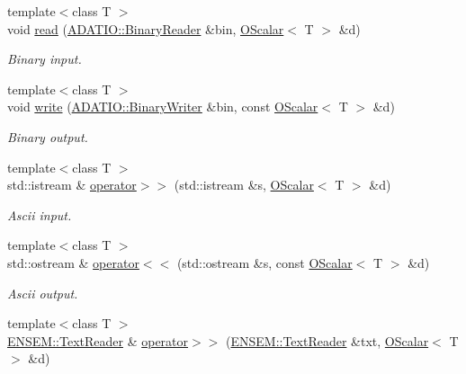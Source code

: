 \begin{DoxyCompactItemize}
\item 
{\footnotesize template$<$class T $>$ }\\void \mbox{\hyperlink{group__obsscalar_ga5b22786975bbf72d834fd044913a417b}{read}} (\mbox{\hyperlink{classADATIO_1_1BinaryReader}{A\+D\+A\+T\+I\+O\+::\+Binary\+Reader}} \&bin, \mbox{\hyperlink{classENSEM_1_1OScalar}{O\+Scalar}}$<$ T $>$ \&d)
\begin{DoxyCompactList}\small\item\em Binary input. \end{DoxyCompactList}\item 
{\footnotesize template$<$class T $>$ }\\void \mbox{\hyperlink{group__obsscalar_ga921d40c8afba8e09044b5c679c71b495}{write}} (\mbox{\hyperlink{classADATIO_1_1BinaryWriter}{A\+D\+A\+T\+I\+O\+::\+Binary\+Writer}} \&bin, const \mbox{\hyperlink{classENSEM_1_1OScalar}{O\+Scalar}}$<$ T $>$ \&d)
\begin{DoxyCompactList}\small\item\em Binary output. \end{DoxyCompactList}\item 
{\footnotesize template$<$class T $>$ }\\std\+::istream \& \mbox{\hyperlink{group__obsscalar_ga8ceaf63a1afb58830666610d78d86809}{operator$>$$>$}} (std\+::istream \&s, \mbox{\hyperlink{classENSEM_1_1OScalar}{O\+Scalar}}$<$ T $>$ \&d)
\begin{DoxyCompactList}\small\item\em Ascii input. \end{DoxyCompactList}\item 
{\footnotesize template$<$class T $>$ }\\std\+::ostream \& \mbox{\hyperlink{group__obsscalar_ga7ac0c3b6cd38466c57c199a30f7795cd}{operator$<$$<$}} (std\+::ostream \&s, const \mbox{\hyperlink{classENSEM_1_1OScalar}{O\+Scalar}}$<$ T $>$ \&d)
\begin{DoxyCompactList}\small\item\em Ascii output. \end{DoxyCompactList}\item 
{\footnotesize template$<$class T $>$ }\\\mbox{\hyperlink{classENSEM_1_1TextReader}{E\+N\+S\+E\+M\+::\+Text\+Reader}} \& \mbox{\hyperlink{group__obsscalar_ga0ec7538d973fc2e40220fd1ef622f982}{operator$>$$>$}} (\mbox{\hyperlink{classENSEM_1_1TextReader}{E\+N\+S\+E\+M\+::\+Text\+Reader}} \&txt, \mbox{\hyperlink{classENSEM_1_1OScalar}{O\+Scalar}}$<$ T $>$ \&d)

\end{DoxyCompactItemize}

